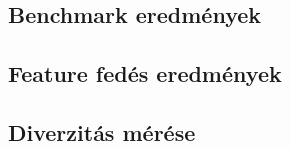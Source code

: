 \chapter{\evaluation}

\section{Benchmark eredmények}
\section{Feature fedés eredmények} 

\section{Diverzitás mérése}
